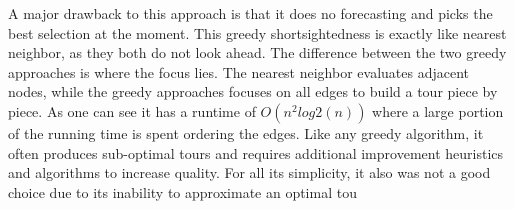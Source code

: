 \documentclass{article}
\begin{document}
A major drawback to this approach is that it does no forecasting and picks the best selection at
the moment. This greedy shortsightedness is exactly like nearest neighbor, as they both do not
look ahead. The difference between the two greedy approaches is where the focus lies. The
nearest neighbor evaluates adjacent nodes, while the greedy approaches focuses on all edges to
build a tour piece by piece. As one can see it has a runtime of $O(n^2 log2(n))$ \cite{nilsson2003heuristics} where a large
portion of the running time is spent ordering the edges. Like any greedy algorithm, it often
produces sub-optimal tours and requires additional improvement heuristics and algorithms to
increase quality. For all its simplicity, it also was not a good choice due to its inability to
approximate an optimal tou
\end{document}
